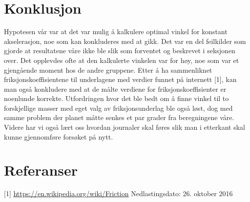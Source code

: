\documentclass[10pt,a4paper]{report}
\begin{document}
{\let\clearpage\relax\chapter*{Konklusjon}}
Hypotesen vår var at det var mulig å kalkulere optimal vinkel for konstant akselerasjon, noe som kan konkluderes med at gikk. Det var en del feilkilder som gjorde at resultatene våre ikke ble slik som forventet og beskrevet i seksjonen over. Det opplevdes ofte at den kalkulerte vinkelen var for høy, noe som var et gjengående moment hos de andre gruppene. Etter å ha sammenliknet friksjonskoeffisientene til underlagene med verdier funnet på internett [1], kan man også konkludere med at de målte verdiene for friksjonskoeffisienter er noenlunde korrekte. Utfordringen hvor det ble bedt om å finne vinkel til to forskjellige masser med eget valg av friksjonsunderlag ble også løst, dog med samme problem der planet måtte senkes et par grader fra beregningene våre. Videre har vi også lært oss hvordan journaler skal føres slik man i etterkant skal kunne gjennomføre forsøket på nytt.

\chapter*{Referanser}
[1] \href{url}{https://en.wikipedia.org/wiki/Friction}
Nedlastingsdato: 26. oktober 2016
\end{document}
